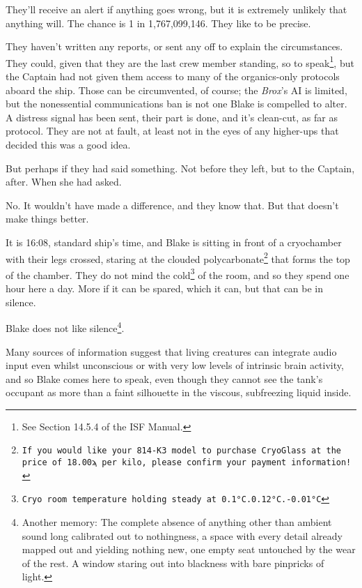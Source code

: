 They'll receive an alert if anything goes wrong, but it is extremely
unlikely that anything will. The chance is 1 in 1,767,099,146. They
like to be precise.

They haven't written any reports, or sent any off to explain the
circumstances. They could, given that they are the last crew member
standing, so to speak\footnote{See Section 14.5.4 of the ISF Manual.},
but the Captain had not given them access to many of the organics-only
protocols aboard the ship. Those can be circumvented, of course;
the \textit{Brox}'s AI is limited, but the nonessential communications
ban is not one Blake is compelled to alter. A distress signal has been
sent, their part is done, and it's clean-cut, as far as protocol. They
are not at fault, at least not in the eyes of any higher-ups that
decided this was a good idea.

But perhaps if they had said something. Not before they left, but to
the Captain, after. When she had asked.

No. It wouldn't have made a difference, and they know that. But that
doesn't make things better.

It is 16:08, standard ship's time, and Blake is sitting in front of a
cryochamber with their legs crossed, staring at the clouded
polycarbonate\footnote{\texttt{If you would like your 814-K3 model to
purchase CryoGlass\texttrademark{} at the price of 18.00ϡ per kilo,
please confirm your payment information!}} that forms the top of the
chamber. They do not mind the cold\footnote{\texttt{Cryo room
temperature holding steady at
0.1°C\textellipsis{}.0.12°C\textellipsis{}.-0.01°C\textellipsis{}}} of
the room, and so they spend one hour here a day. More if it can be
spared, which it can, but that can be in silence.

Blake does not like silence\footnote{Another memory: The complete
absence of anything other than ambient sound long calibrated out to
nothingness, a space with every detail already mapped out and yielding
nothing new, one empty seat untouched by the wear of the rest. A
window staring out into blackness with bare pinpricks of light.}.

Many sources of information suggest that living creatures can
integrate audio input even whilst unconscious or with very low levels
of intrinsic brain activity, and so Blake comes here to speak, even
though they cannot see the tank's occupant as more than a faint
silhouette in the viscous, subfreezing liquid inside.

